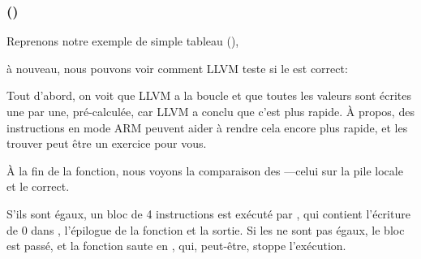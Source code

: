 \subsubsection{\OptimizingXcodeIV (\ThumbTwoMode)}

Reprenons notre exemple de simple tableau (),

à nouveau, nous pouvons voir comment LLVM teste si le  est correct:




Tout d'abord, on voit que LLVM a  la boucle et que toutes les valeurs
sont écrites une par une, pré-calculée, car LLVM a conclu que c'est plus rapide.
À propos, des instructions en mode ARM peuvent aider à rendre cela encore plus rapide,
et les trouver peut être un exercice pour vous.

À la fin de la fonction, nous voyons la comparaison des ---celui sur la
pile locale et le correct.

S'ils sont égaux, un bloc de 4 instructions est exécuté par , qui
contient l'écriture de 0 dans , l'épilogue de la fonction et la sortie.
Si les  ne sont pas égaux, le bloc est passé, et la fonction saute en
, qui, peut-être, stoppe l'exécution.
